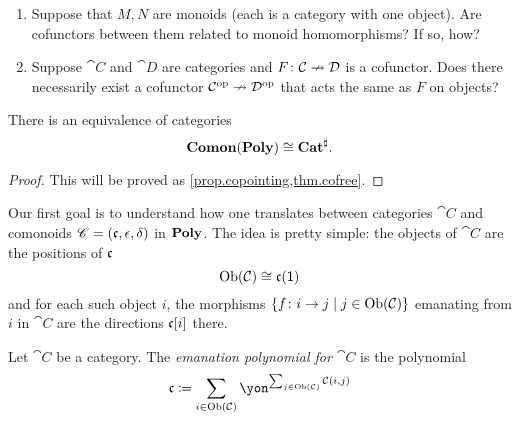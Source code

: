 \documentclass[Book-Poly]{subfiles}
\begin{document}
\begin{exercise}
\begin{enumerate}
	\item Suppose that $M,N$ are monoids (each is a category with one object). Are cofunctors between them related to monoid homomorphisms? If so, how?
	\item Suppose $\cat{C}$ and $\cat{D}$ are categories and $F\colon\mathcal{C}\nrightarrow\mathcal{D}$ is a cofunctor. Does there necessarily exist a cofunctor $\mathcal{C}^{\textnormal{op}}\nrightarrow\mathcal{D}^{\textnormal{op}}$ that acts the same as $F$ on objects?
\qedhere
\end{enumerate}
\end{exercise}

\begin{theorem}\label{thm.ahman_uustalu}
There is an equivalence of categories
\[
\mathbf{Comon}(\mathbf{Poly})\cong\mathbf{Cat}^\sharp.
\]
\end{theorem}
\begin{proof}
This will be proved as \cref{prop.copointing,thm.cofree}.
\end{proof}

Our first goal is to understand how one translates between categories $\cat{C}$ and comonoids $\mathscr{C}=(\mathfrak{c},\epsilon,\delta)$ in $\mathbf{Poly}$. The idea is pretty simple: the objects of $\cat{C}$ are the positions of $\mathfrak{c}$
\[
\operatorname{Ob}(\mathcal{C})\cong\mathfrak{c}(\textsf{1})
\]
and for each such object $i$, the morphisms $\{f\colon i\to j\mid j\in\operatorname{Ob}(\mathcal{C})\}$ emanating from $i$ in $\cat{C}$ are the directions $\mathfrak{c}[i]$ there.

\begin{definition}
Let $\cat{C}$ be a category. The \emph{emanation polynomial for $\cat{C}$} is the polynomial
\[
\ema{c}\coloneqq\sum_{i\in\Ob(\cat{C})}\yon^{\sum_{j\in\Ob(\cat{C})}\cat{C}(i,j)}
\]
\end{definition}
\end{document}
